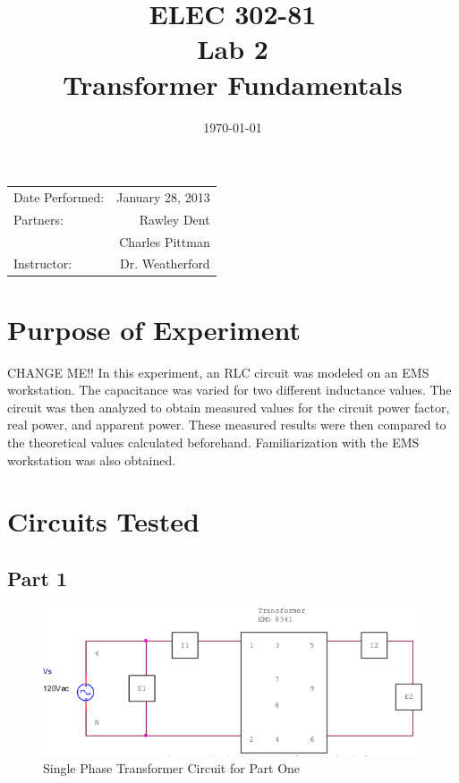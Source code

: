 \documentclass{article}
\title{ELEC 302-81\\ Lab 2\\ Transformer Fundamentals} %
\date{\today} %
\begin{document}
\maketitle

\begin{center}
  \begin{tabular}{lr}
    Date Performed: & January 28, 2013 \\
    Partners: & Rawley Dent \\
              & Charles Pittman \\
    Instructor: & Dr. Weatherford
  \end{tabular}
\end{center}

\pagebreak


\section{Purpose of Experiment}
CHANGE ME!! In this experiment, an RLC circuit was modeled on an EMS
workstation.  The capacitance was varied for two different inductance values.
The circuit was then analyzed to obtain measured values for the circuit power
factor, real power, and apparent power. These measured results were then
compared to the theoretical values calculated beforehand. Familiarization with
the EMS workstation was also obtained.

\section{Circuits Tested}
\subsection*{Part 1}
\begin{figure}[h]
  \centering
  \includegraphics[width=.8\textwidth]{circuit_01}
  \caption{Single Phase Transformer Circuit for Part One}
  \label{fig:circuit_01}
\end{figure}
\end{document}
